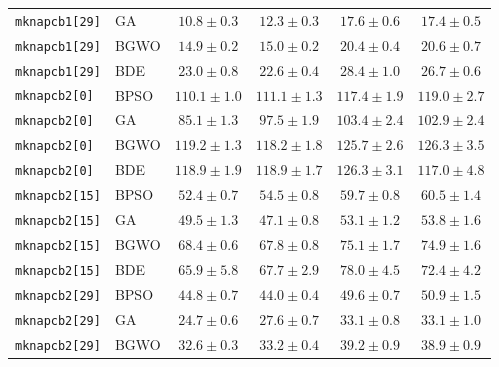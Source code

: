 \documentclass[journal,article,submit,moreauthors]{Definitions/mdpi}
\begin{document}
\begin{longtable}{llcccc}
    \texttt{mknapcb1[29]} & GA    &  $\mathbf{10.8 \pm 0.3}$ &           $12.3 \pm 0.3$ &           $17.6 \pm 0.6$ &           $17.4 \pm 0.5$ \\
    \texttt{mknapcb1[29]} & BGWO  &  $\mathbf{14.9 \pm 0.2}$ &           $15.0 \pm 0.2$ &           $20.4 \pm 0.4$ &           $20.6 \pm 0.7$ \\
    \texttt{mknapcb1[29]} & BDE   &           $23.0 \pm 0.8$ &  $\mathbf{22.6 \pm 0.4}$ &           $28.4 \pm 1.0$ &           $26.7 \pm 0.6$ \\
    \midrule
    \texttt{mknapcb2[0]} & BPSO  & $\mathbf{110.1 \pm 1.0}$ &          $111.1 \pm 1.3$ &          $117.4 \pm 1.9$ &          $119.0 \pm 2.7$ \\
    \texttt{mknapcb2[0]} & GA    &  $\mathbf{85.1 \pm 1.3}$ &           $97.5 \pm 1.9$ &          $103.4 \pm 2.4$ &          $102.9 \pm 2.4$ \\
    \texttt{mknapcb2[0]} & BGWO  &          $119.2 \pm 1.3$ & $\mathbf{118.2 \pm 1.8}$ &          $125.7 \pm 2.6$ &          $126.3 \pm 3.5$ \\
    \texttt{mknapcb2[0]} & BDE   &          $118.9 \pm 1.9$ &          $118.9 \pm 1.7$ &          $126.3 \pm 3.1$ & $\mathbf{117.0 \pm 4.8}$ \\
    \midrule
    \texttt{mknapcb2[15]} & BPSO  &  $\mathbf{52.4 \pm 0.7}$ &           $54.5 \pm 0.8$ &           $59.7 \pm 0.8$ &           $60.5 \pm 1.4$ \\
    \texttt{mknapcb2[15]} & GA    &           $49.5 \pm 1.3$ &  $\mathbf{47.1 \pm 0.8}$ &           $53.1 \pm 1.2$ &           $53.8 \pm 1.6$ \\
    \texttt{mknapcb2[15]} & BGWO  &           $68.4 \pm 0.6$ &  $\mathbf{67.8 \pm 0.8}$ &           $75.1 \pm 1.7$ &           $74.9 \pm 1.6$ \\
    \texttt{mknapcb2[15]} & BDE   &  $\mathbf{65.9 \pm 5.8}$ &           $67.7 \pm 2.9$ &           $78.0 \pm 4.5$ &           $72.4 \pm 4.2$ \\
    \midrule
    \texttt{mknapcb2[29]} & BPSO  &           $44.8 \pm 0.7$ &  $\mathbf{44.0 \pm 0.4}$ &           $49.6 \pm 0.7$ &           $50.9 \pm 1.5$ \\
    \texttt{mknapcb2[29]} & GA    &  $\mathbf{24.7 \pm 0.6}$ &           $27.6 \pm 0.7$ &           $33.1 \pm 0.8$ &           $33.1 \pm 1.0$ \\
    \texttt{mknapcb2[29]} & BGWO  &  $\mathbf{32.6 \pm 0.3}$ &           $33.2 \pm 0.4$ &           $39.2 \pm 0.9$ &           $38.9 \pm 0.9$ \\

\end{longtable}
\end{document}
